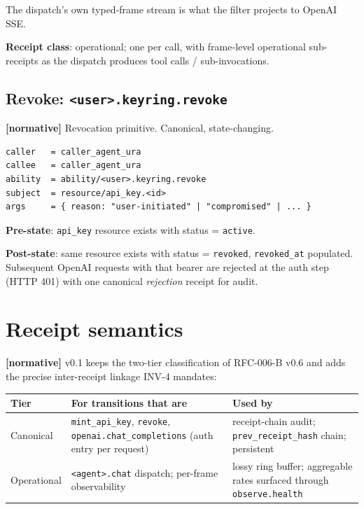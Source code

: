 \documentclass[11pt,a4paper]{article}
\newcommand{\normsv}{\textcolor{normativecolor}{\textbf{[normative]}}\xspace}
\theoremstyle{definition}
\begin{document}
The dispatch's own typed-frame stream is what the filter projects to OpenAI SSE.

\textbf{Receipt class}: operational; one per call, with frame-level operational sub-receipts as the dispatch produces tool calls / sub-invocations.

\subsection{Revoke: \texttt{<user>.keyring.revoke}}

\normsv{} Revocation primitive. Canonical, state-changing.

\begin{lstlisting}
caller   = caller_agent_ura
callee   = caller_agent_ura
ability  = ability/<user>.keyring.revoke
subject  = resource/api_key.<id>
args     = { reason: "user-initiated" | "compromised" | ... }
\end{lstlisting}

\textbf{Pre-state}: \texttt{api\_key} resource exists with status = \texttt{active}.

\textbf{Post-state}: same resource exists with status = \texttt{revoked}, \texttt{revoked\_at} populated. Subsequent OpenAI requests with that bearer are rejected at the auth step (HTTP 401) with one canonical \emph{rejection} receipt for audit.

\section{Receipt semantics}
\label{sec:receipts}

\normsv{} v0.1 keeps the two-tier classification of RFC-006-B
v0.6 and adds the precise inter-receipt linkage INV-4 mandates:

\begin{center}
\renewcommand{\arraystretch}{1.18}
\begin{tabularx}{\linewidth}{l X X}
\toprule
\textbf{Tier} & \textbf{For transitions that are} & \textbf{Used by} \\
\midrule
Canonical
 & \texttt{mint\_api\_key}, \texttt{revoke}, \texttt{openai.chat\_completions} (auth entry per request)
 & receipt-chain audit; \texttt{prev\_receipt\_hash} chain; persistent \\
Operational
 & \texttt{<agent>.chat} dispatch; per-frame observability
 & lossy ring buffer; aggregable rates surfaced through \texttt{observe.health} \\
\bottomrule
\end{tabularx}
\end{center}
\end{document}
